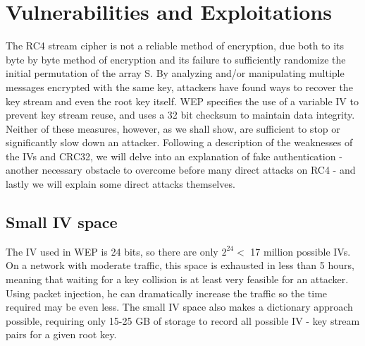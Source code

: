 \documentclass[12pt]{article}
\begin{document}
\section{Vulnerabilities and Exploitations}
\label{sec:vuln}
The RC4 stream cipher is not a reliable method of encryption, due both to its byte by byte method of encryption and its failure to sufficiently randomize the initial permutation of the array S.  By analyzing and/or manipulating multiple messages encrypted with the same key, attackers have found ways to recover the key stream and even the root key itself.  WEP specifies the use of a variable IV to prevent key stream reuse, and uses a 32 bit checksum to maintain data integrity.  Neither of these measures, however, as we shall show, are sufficient to stop or significantly slow down an attacker.  Following a description of the weaknesses of the IVs and CRC32, we will delve into an explanation of fake authentication - another necessary obstacle to overcome before many direct attacks on RC4 - and lastly we will explain some direct attacks themselves.

\subsection{Small IV space}
The IV used in WEP is 24 bits, so there are only $2^{24}<$ 17 million possible IVs.  On a network with moderate traffic, this space is exhausted in less than 5 hours, meaning that waiting for a key collision is at least very feasible for an attacker.  Using packet injection, he can dramatically increase the traffic so the time required may be even less.  The small IV space also makes a dictionary approach possible, requiring only 15-25 GB of storage to record all possible IV - key stream pairs for a given root key.
\end{document}

